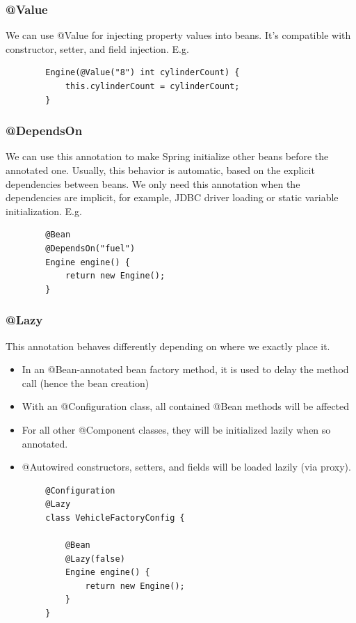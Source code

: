 \documentclass{scrartcl}
\begin{document}
\subsubsection{@Value}

    We can use @Value for injecting property values into beans. It’s compatible with constructor, setter, and field injection. E.g.

    \begin{lstlisting}
        Engine(@Value("8") int cylinderCount) {
            this.cylinderCount = cylinderCount;
        }
    \end{lstlisting}

\subsubsection{@DependsOn}

    We can use this annotation to make Spring initialize other beans before the annotated one. Usually, this behavior is automatic, based on the explicit dependencies between beans. We only need this annotation when the dependencies are implicit, for example, JDBC driver loading or static variable initialization. E.g.

     \begin{lstlisting}
        @Bean
        @DependsOn("fuel")
        Engine engine() {
            return new Engine();
        }
    \end{lstlisting}

\subsubsection{@Lazy}

    This annotation behaves differently depending on where we exactly place it.

    \begin{itemize}
        \item In an @Bean-annotated bean factory method, it is used to delay the method call (hence the bean creation)
        \item With an @Configuration class, all contained @Bean methods will be affected
        \item For all other @Component classes,  they will be initialized lazily when so annotated.
        \item @Autowired constructors, setters, and fields will be loaded lazily (via proxy).
    \end{itemize}

    \begin{lstlisting}
        @Configuration
        @Lazy
        class VehicleFactoryConfig {

            @Bean
            @Lazy(false)
            Engine engine() {
                return new Engine();
            }
        }
    \end{lstlisting}
\end{document}

